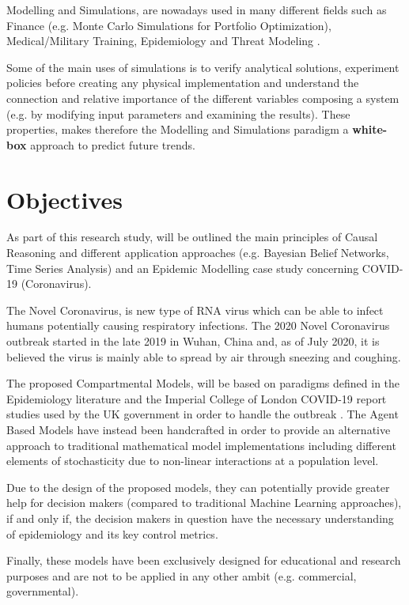 Modelling and Simulations, are nowadays used in many different fields such as Finance (e.g. Monte Carlo Simulations for Portfolio Optimization), Medical/Military Training, Epidemiology and Threat Modeling \cite{mod_2, mod_3}. 

Some of the main uses of simulations is to verify analytical solutions, experiment policies before creating any physical implementation and understand the connection and relative importance of the different variables composing a system (e.g. by modifying input parameters and examining the results). These properties, makes therefore the Modelling and Simulations paradigm a \textbf{white-box} approach to predict future trends.

\section{Objectives}
\vspace{-0.1cm}
As part of this research study, will be outlined the main principles of Causal Reasoning and different application approaches (e.g. Bayesian Belief Networks, Time Series Analysis) and an Epidemic Modelling case study concerning COVID-19 (Coronavirus). 

The Novel Coronavirus, is new type of RNA virus which can be able to infect humans potentially causing respiratory infections. The 2020 Novel Coronavirus outbreak started in the late 2019 in Wuhan, China and, as of July 2020, it is believed the virus is mainly able to spread by air through sneezing and coughing. 

The proposed Compartmental Models, will be based on paradigms defined in the Epidemiology literature \cite{adam_k} and the Imperial College of London COVID-19 report studies used by the UK government in order to handle the outbreak \cite{mod_4}. The Agent Based Models have instead been handcrafted in order to provide an alternative approach to traditional mathematical model implementations including different elements of stochasticity due to non-linear interactions at a population level. 

Due to the design of the proposed models, they can potentially provide greater help for decision makers (compared to traditional Machine Learning approaches), if and only if, the decision makers in question have the necessary understanding of epidemiology and its key control metrics. 

Finally, these models have been exclusively designed for educational and research purposes and are not to be applied in any other ambit (e.g. commercial, governmental).

